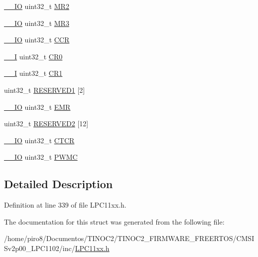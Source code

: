 \begin{DoxyCompactItemize}
\item 
\hyperlink{group___c_m_s_i_s__core__definitions_gaec43007d9998a0a0e01faede4133d6be}{\+\_\+\+\_\+\+IO} uint32\+\_\+t \hyperlink{group___l_p_c11xx___definitions_gaa364c4a95084f74482259dae570a5b08}{M\+R2}
\item 
\hyperlink{group___c_m_s_i_s__core__definitions_gaec43007d9998a0a0e01faede4133d6be}{\+\_\+\+\_\+\+IO} uint32\+\_\+t \hyperlink{group___l_p_c11xx___definitions_ga025ea47a7567ed8afb77463081a86f0c}{M\+R3}
\item 
\hyperlink{group___c_m_s_i_s__core__definitions_gaec43007d9998a0a0e01faede4133d6be}{\+\_\+\+\_\+\+IO} uint32\+\_\+t \hyperlink{group___l_p_c11xx___definitions_ga097d57fef779a73f06690de0b0710753}{C\+CR}
\item 
\hyperlink{group___c_m_s_i_s__core__definitions_gaf63697ed9952cc71e1225efe205f6cd3}{\+\_\+\+\_\+I} uint32\+\_\+t \hyperlink{group___l_p_c11xx___definitions_ga62fb131eb523de2ee3bf8c7882d7ee61}{C\+R0}
\item 
\hyperlink{group___c_m_s_i_s__core__definitions_gaf63697ed9952cc71e1225efe205f6cd3}{\+\_\+\+\_\+I} uint32\+\_\+t \hyperlink{group___l_p_c11xx___definitions_ga38ad1e04b125d455b3881f652cfe14c3}{C\+R1}
\item 
uint32\+\_\+t \hyperlink{group___l_p_c11xx___definitions_ga9a4fb508969702f0f6768a515dd3a08a}{R\+E\+S\+E\+R\+V\+E\+D1} \mbox{[}2\mbox{]}
\item 
\hyperlink{group___c_m_s_i_s__core__definitions_gaec43007d9998a0a0e01faede4133d6be}{\+\_\+\+\_\+\+IO} uint32\+\_\+t \hyperlink{group___l_p_c11xx___definitions_ga3b565bf2661f6ca601c2dad16cc3eca0}{E\+MR}
\item 
uint32\+\_\+t \hyperlink{group___l_p_c11xx___definitions_gaf8194b9a61c94110beb56893fbff4947}{R\+E\+S\+E\+R\+V\+E\+D2} \mbox{[}12\mbox{]}
\item 
\hyperlink{group___c_m_s_i_s__core__definitions_gaec43007d9998a0a0e01faede4133d6be}{\+\_\+\+\_\+\+IO} uint32\+\_\+t \hyperlink{group___l_p_c11xx___definitions_ga9f161dc0d6e4dd663a2053058141bc55}{C\+T\+CR}
\item 
\hyperlink{group___c_m_s_i_s__core__definitions_gaec43007d9998a0a0e01faede4133d6be}{\+\_\+\+\_\+\+IO} uint32\+\_\+t \hyperlink{group___l_p_c11xx___definitions_ga26fca58bbc7cc65cdca1286221a3abc6}{P\+W\+MC}
\end{DoxyCompactItemize}


\subsection{Detailed Description}


Definition at line 339 of file L\+P\+C11xx.\+h.



The documentation for this struct was generated from the following file\+:\begin{DoxyCompactItemize}
\item 
/home/piro8/\+Documentos/\+T\+I\+N\+O\+C2/\+T\+I\+N\+O\+C2\+\_\+\+F\+I\+R\+M\+W\+A\+R\+E\+\_\+\+F\+R\+E\+E\+R\+T\+O\+S/\+C\+M\+S\+I\+Sv2p00\+\_\+\+L\+P\+C1102/inc/\hyperlink{_l_p_c11xx_8h}{L\+P\+C11xx.\+h}\end{DoxyCompactItemize}
